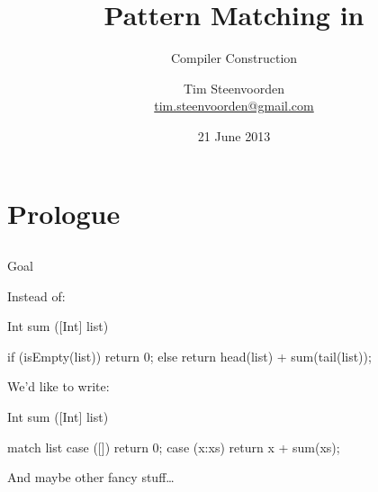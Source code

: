 

  {}
  {}



\subtitle {Compiler Construction}
\title    {Pattern Matching in \SPL}
\author   [Tim Steenvoorden]
          {Tim Steenvoorden\\
           \medskip
           {\small \url{tim.steenvoorden@gmail.com}}}%
\date     {21 June 2013}

\begin{frame}
  \titlepage
\end{frame}


\section{Prologue}
\subsection*{}

\begin{frame}[fragile]{Goal}

  \begin{twocolumns}
    Instead of:
    \begin{code}
      Int sum ([Int] list) {

        if (isEmpty(list))
          return 0;
        else
          return head(list) +
                 sum(tail(list));
      }
    \end{code}
    \pause
    \nextcolumn
    We'd like to write:
    \begin{code}
      Int sum ([Int] list) {
        match list
        case ([])
          return 0;
        case (x:xs)
          return x + sum(xs);

      }
    \end{code}
  \end{twocolumns}

  And maybe other fancy stuff\dots

\end{frame}

